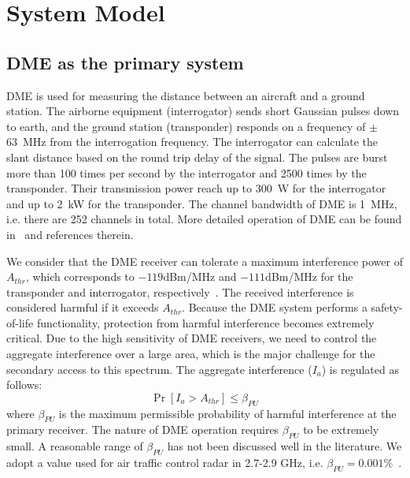 \documentclass[12pt,submission,journal,onecolumn]{IEEEtran}
\begin{document}
\section{System Model}
\label{sec:SystemModel}

\subsection{DME as the primary system}
\label{sec:DME}
DME is used for measuring the distance between an aircraft and a ground station. The airborne equipment (interrogator) sends short Gaussian pulses down to earth, and the ground station (transponder) responds on a frequency of $\pm$63~MHz from the interrogation frequency. The interrogator can calculate the slant distance based on the round trip delay of the signal. The pulses are burst more than 100 times per second by the interrogator and 2500 times by the transponder. Their transmission power reach up to 300~W for the interrogator and up to 2~kW for the transponder. The channel bandwidth of DME is 1~MHz, i.e. there are 252 channels in total. More detailed operation of DME can be found in~\cite{5936226} and references therein.

We consider that the DME receiver can tolerate a maximum interference power of $A_{thr}$, which corresponds to $-119$dBm/MHz and $-111$dBm/MHz for the transponder and interrogator, respectively~\cite{5936226}. The received interference is considered harmful if it exceeds $A_{thr}$.
Because the DME system performs a safety-of-life functionality, protection from harmful interference becomes extremely critical. Due to the high sensitivity of DME receivers, we need to control the aggregate interference over a large area, which is the major challenge for the secondary access to this spectrum. The aggregate interference ($I_{a}$) is regulated as follows:
\begin{equation}
\label{eq:ProtectionDME}
\Pr[I_{a}> A_{thr}]\leq\beta_{PU}
\end{equation}
where $\beta_{PU}$ is the maximum permissible probability of harmful interference at the primary receiver. The nature of DME operation requires $\beta_{PU}$ to be extremely small. A reasonable range of $\beta_{PU}$ has not been discussed well in the literature. We adopt a value used for air traffic control radar in 2.7-2.9 GHz, i.e. $\beta_{PU} = 0.001\%$~\cite{ImadurPIRMC}.
\end{document}
